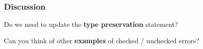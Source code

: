 \begin{frame}
  \frametitle{Discussion}

  Do we need to update the \textbf{type preservation} statement?

  \pause
  \bigskip
  
  Can you think of other \textbf{examples} of checked / unchecked errors?
\end{frame}


